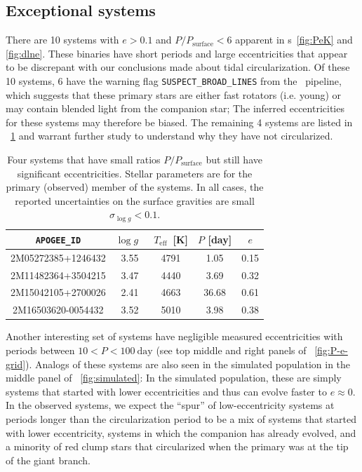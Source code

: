 \documentclass[modern, letterpaper]{aastex62}
\newcommand{\apogee}{\project{\acronym{APOGEE}}}
\newcommand{\logg}{\ensuremath{\log g}}
\newcommand{\Teff}{\ensuremath{T_{\textrm{eff}}}}
\newcommand{\Psurf}{\ensuremath{P_\textrm{surface}}}
\begin{document}
%
%

\subsection{Exceptional systems}

There are 10 systems with $e > 0.1$ and $P/\Psurf < 6$ apparent in \figurename
s~\ref{fig:PeK} and \ref{fig:dlne}.
These binaries have short periods and large eccentricities that appear to be
discrepant with our conclusions made about tidal circularization.
Of these 10 systems, 6 have the warning flag \texttt{SUSPECT\_BROAD\_LINES} from
the \apogee\ pipeline, which suggests that these primary stars are either fast
rotators (i.e. young) or may contain blended light from the companion star; The
inferred eccentricities for these systems may therefore be biased.
The remaining 4 systems are listed in \tablename~\ref{tbl:except} and warrant
further study to understand why they have not circularized.

\begin{table}[h]
    \centering
    \begin{tabular}{ c c c c c }
    \hline
    \texttt{APOGEE\_ID} & \logg\ & \Teff\ [K] & $P$ [day] & $e$ \\
    \hline
    2M05272385+1246432 & 3.55 & 4791 & 1.05 & 0.15\\
    2M11482364+3504215 & 3.47 & 4440 & 3.69 & 0.32\\
    2M15042105+2700026 & 2.41 & 4663 & 36.68 & 0.61\\
    2M16503620-0054432 & 3.52 & 5010 & 3.98 & 0.38\\
    \hline
    \end{tabular}
    \caption{Four systems that have small ratios $P/\Psurf$ but still have
    significant eccentricities.
    Stellar parameters are for the primary (observed) member of the systems.
    In all cases, the reported uncertainties on the surface gravities are small
    $\sigma_{\logg} < 0.1$.
    }
    \label{tbl:except}
\end{table}

Another interesting set of systems have negligible measured eccentricities with
periods between $10 < P < 100~\textrm{day}$ (see top middle and right panels of
\figurename~\ref{fig:P-e-grid}).
Analogs of these systems are also seen in the simulated population in the middle
panel of \figurename~\ref{fig:simulated}: In the simulated population, these are
simply systems that started with lower eccentricities and thus can evolve faster
to $e \approx 0$.
In the observed systems, we expect the ``spur'' of low-eccentricity systems at
periods longer than the circularization period to be a mix of systems that
started with lower eccentricity, systems in which the companion has already
evolved, and a minority of red clump stars that circularized when the primary
was at the tip of the giant branch.
\end{document}

